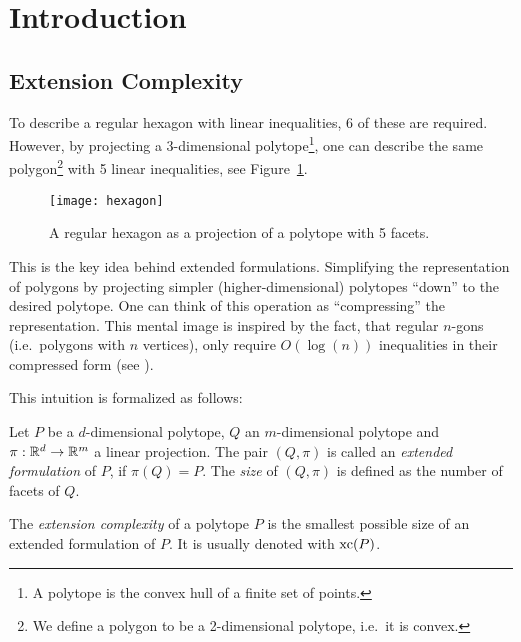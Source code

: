 \section{Introduction} 

\subsection{Extension Complexity}

To describe a regular hexagon with linear inequalities, 6 of these are required. However, by projecting a 3-dimensional polytope\footnote{A polytope is the convex hull of a finite set of points.}, one can describe the same polygon\footnote{We define a polygon to be a 2-dimensional polytope, i.e.\ it is convex.} with 5 linear inequalities, see Figure~\ref{fig:hexagon}. 

\begin{figure}[ht]
  \centering
  \texttt{[image: hexagon]}
  \caption{A regular hexagon as a projection of a polytope with 5 facets. \cite[Figure 1]{kwan2020extension}}
  \label{fig:hexagon}
\end{figure}

This is the key idea behind extended formulations. Simplifying the representation of polygons by projecting simpler (higher-dimensional) polytopes ``down'' to the desired polytope.
One can think of this operation as ``compressing'' the representation. This mental image is inspired by the fact, that regular $n$-gons (i.e.\ polygons with $n$ vertices), only require $O(\log(n))$ inequalities in their compressed form (see \cite{kaibel2010constructing}).

This intuition is formalized as follows:

\begin{definition}
  Let $P$ be a $d$-dimensional polytope, $Q$ an $m$-dimensional polytope and $\pi:\mathbb{R}^d \to \mathbb{R}^m$ a linear projection.
  The pair $(Q,\pi)$ is called an \emph{extended formulation} of $P$, if $\pi(Q)=P$. The \emph{size} of $(Q,\pi)$ is defined as the number of facets of $Q$.
\end{definition}

\begin{definition}
  The \emph{extension complexity} of a polytope $P$ is the smallest possible size of an extended formulation of $P$. It is usually denoted with $\operatorname{xc}(P)$.
\end{definition}

